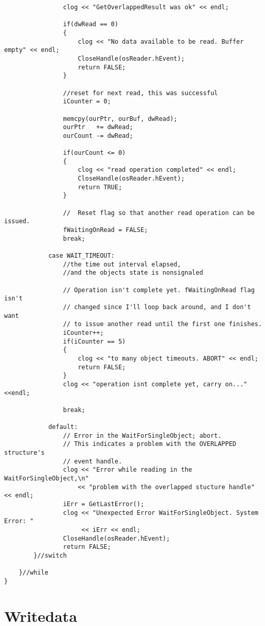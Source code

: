 \begin{lstlisting}
				clog << "GetOverlappedResult was ok" << endl;
				
				if(dwRead == 0)
				{
					clog << "No data available to be read. Buffer empty" << endl;
					CloseHandle(osReader.hEvent);
					return FALSE;
				}

				//reset for next read, this was successful
				iCounter = 0;
				
				memcpy(ourPtr, ourBuf, dwRead);
				ourPtr   += dwRead;
				ourCount -= dwRead;
					
				if(ourCount <= 0) 
				{
					clog << "read operation completed" << endl;
					CloseHandle(osReader.hEvent);
					return TRUE;
				}

				//  Reset flag so that another read operation can be issued.
				fWaitingOnRead = FALSE;
				break;

			case WAIT_TIMEOUT:
				//the time out interval elapsed,
				//and the objects state is nonsignaled

				// Operation isn't complete yet. fWaitingOnRead flag isn't
				// changed since I'll loop back around, and I don't want
				// to issue another read until the first one finishes.
				iCounter++;
				if(iCounter == 5)
				{
					clog << "to many object timeouts. ABORT" << endl;
					return FALSE;
				}
				clog << "operation isnt complete yet, carry on..."<<endl;

				break;                       

			default:
				// Error in the WaitForSingleObject; abort.
				// This indicates a problem with the OVERLAPPED structure's
				// event handle.
				clog << "Error while reading in the WaitForSingleObject,\n"
					<< "problem with the overlapped stucture handle" << endl;
				iErr = GetLastError();
				clog << "Unexpected Error WaitForSingleObject. System Error: "
				     << iErr << endl;
				CloseHandle(osReader.hEvent);
				return FALSE;
		}//switch

	}//while
}
\end{lstlisting}



\newpage
\section{Writedata}\label{WriteDataCode}

